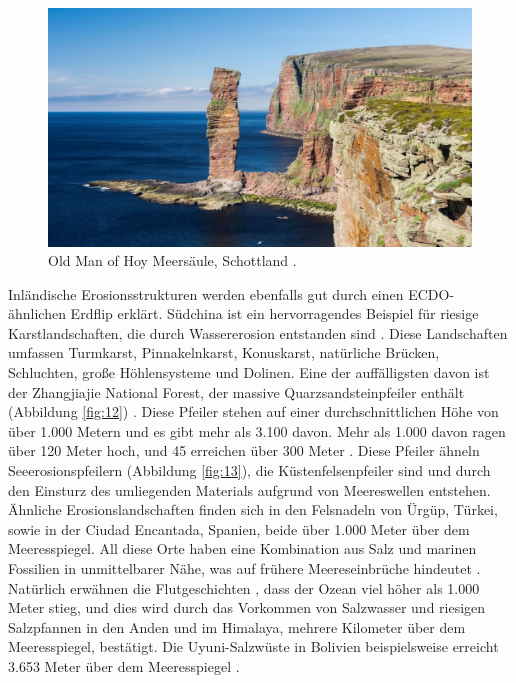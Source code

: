 \documentclass[10pt,twocolumn,letterpaper]{article}
\begin{document}
\begin{figure}[b]
\begin{center}
   \includegraphics[width=1\linewidth]{hoy.jpg}
\end{center}
   \caption{Old Man of Hoy Meersäule, Schottland \cite{83}.}
\label{fig:13}
\label{fig:onecol}
\end{figure}
Inländische Erosionsstrukturen werden ebenfalls gut durch einen ECDO-ähnlichen Erdflip erklärt. Südchina ist ein hervorragendes Beispiel für riesige Karstlandschaften, die durch Wassererosion entstanden sind \cite{82}. Diese Landschaften umfassen Turmkarst, Pinnakelnkarst, Konuskarst, natürliche Brücken, Schluchten, große Höhlensysteme und Dolinen. Eine der auffälligsten davon ist der Zhangjiajie National Forest, der massive Quarzsandsteinpfeiler enthält (Abbildung \ref{fig:12}) \cite{84}. Diese Pfeiler stehen auf einer durchschnittlichen Höhe von über 1.000 Metern und es gibt mehr als 3.100 davon. Mehr als 1.000 davon ragen über 120 Meter hoch, und 45 erreichen über 300 Meter \cite{85}. Diese Pfeiler ähneln Seeerosionspfeilern (Abbildung \ref{fig:13}), die Küstenfelsenpfeiler sind und durch den Einsturz des umliegenden Materials aufgrund von Meereswellen entstehen. Ähnliche Erosionslandschaften finden sich in den Felsnadeln von Ürgüp, Türkei, sowie in der Ciudad Encantada, Spanien, beide über 1.000 Meter über dem Meeresspiegel. All diese Orte haben eine Kombination aus Salz und marinen Fossilien in unmittelbarer Nähe, was auf frühere Meereseinbrüche hindeutet \cite{15,86,87}. Natürlich erwähnen die Flutgeschichten \cite{3}, dass der Ozean viel höher als 1.000 Meter stieg, und dies wird durch das Vorkommen von Salzwasser und riesigen Salzpfannen in den Anden und im Himalaya, mehrere Kilometer über dem Meeresspiegel, bestätigt. Die Uyuni-Salzwüste in Bolivien beispielsweise erreicht 3.653 Meter über dem Meeresspiegel \cite{94}.
\end{document}
